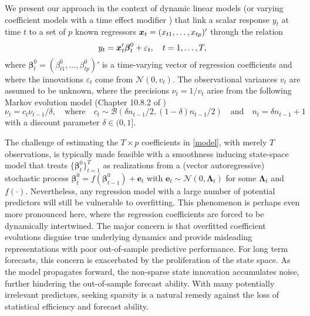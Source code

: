 \documentclass[ba]{imsart}
\numberwithin{equation}{section}
\theoremstyle{plain}
\def\x{\mbox{\boldmath$x$}}
\def\b{\mbox{\boldmath$b$}}
\newcommand{\bm}[1]{\boldsymbol{#1}}
\def\b{\bm{\beta}}
\begin{document}
We present our approach in the context of  dynamic linear models \citep{WestHarrison1997book2} (or varying coefficient models with a time effect modifier \citep{hastie}) that link a scalar response $y_t$ at time $t$ to a set of $p$ known regressors $\x_t=(x_{t1},\dots,x_{tp})'$ through the relation
\begin{equation}\label{model}
y_t=\x_t'\b_{t}^0+\varepsilon_t, \quad t=1,\dots, T,
\end{equation}
where $\b_{t}^0=(\beta_{t1}^0,\dots,\beta_{tp}^0)'$  is a time-varying vector of regression coefficients and where the innovations $\varepsilon_t$  come  from $\mathcal{N}(0,v_t)$. The observational variances $v_t$ are assumed to be unknown, where the precisions $\nu_t=1/v_t$ arise from the following Markov evolution model  (Chapter 10.8.2 of \cite{WestHarrison1997book2})
\begin{equation}\label{eq:dsvt}
\nu_t= c_t\nu_{t-1}/\delta,\quad\text{where}\quad c_{t}\sim\mathcal{B}(\delta n_{t-1}/2,(1-\delta)n_{t-1}/2)\quad\text{and}\quad n_t=\delta n_{t-1}+1
\end{equation}
with a discount parameter $\delta\in(0,1]$.

{The challenge of estimating the $T\times p$ coefficients in \eqref{model}, with merely $T$ observations, is typically made feasible with a smoothness inducing state-space model that} treats  $\{\b^0_t\}_{t=1}^T$ as realizations from a (vector autoregressive) stochastic process $
\b_{t}^0=f(\b_{t-1}^0)+\bm{e}_t$ with $\bm{e}_t\sim\mathcal{N}(0,\bm{\Lambda}_t)
$
for some $\bm{\Lambda}_t$ and $f(\cdot)$.
{Nevertheless, any regression model with a large number of potential predictors will still be vulnerable to overfitting.  This phenomenon is perhaps even more pronounced  here,}  where the regression coefficients are forced to be dynamically intertwined. The major concern is 
that overfitted coefficient evolutions disguise true underlying dynamics and provide misleading representations  with poor out-of-sample predictive performance.   
For long term forecasts, this concern is exacerbated by the proliferation of the state space.
As the model propagates forward, the non-sparse state innovation accumulates noise, further hindering the out-of-sample forecast ability.
With many potentially irrelevant predictors,  seeking sparsity is a natural remedy against the  loss of statistical efficiency and forecast ability. 
\end{document}
